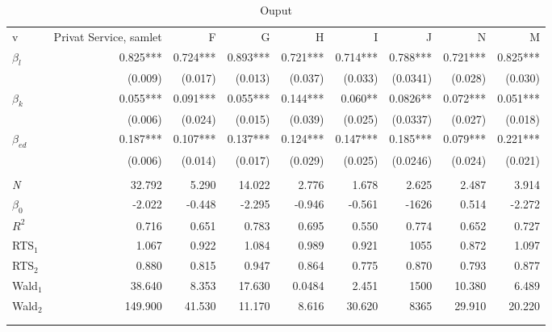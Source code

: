 \begin{table}[tb]
	\centering
	\caption{Ouput}
	\label{tab:ouput3}
	\begin{tabular}{@{}lrrrrrrrr@{}}
		\arrayrulecolor{MidnightBlue}\toprule
		v            & Privat Service, samlet & F        & G        & H        & I        & J        & N        & M        \\ \arrayrulecolor{MidnightBlue}\midrule
		$\beta_l$    & 0.825***               & 0.724*** & 0.893*** & 0.721*** & 0.714*** & 0.788*** & 0.721*** & 0.825*** \\
		& (0.009)                & (0.017)  & (0.013)  & (0.037)  & (0.033)  & (0.0341) & (0.028)  & (0.030)  \\
		$\beta_k$    & 0.055***               & 0.091*** & 0.055*** & 0.144*** & 0.060**  & 0.0826** & 0.072*** & 0.051*** \\
		& (0.006)                & (0.024)  & (0.015)  & (0.039)  & (0.025)  & (0.0337) & (0.027)  & (0.018)  \\
		$\beta_{ed}$ & 0.187***               & 0.107*** & 0.137*** & 0.124*** & 0.147*** & 0.185*** & 0.079*** & 0.221*** \\
		& (0.006)                & (0.014)  & (0.017)  & (0.029)  & (0.025)  & (0.0246) & (0.024)  & (0.021)  \\
		&                        &          &          &          &          &          &          &          \\
		\emph{N}   & 32.792                 & 5.290    & 14.022   & 2.776    & 1.678    & 2.625    & 2.487    & 3.914    \\
		$\beta_0$    & -2.022                 & -0.448   & -2.295   & -0.946   & -0.561   & -1626    & 0.514    & -2.272   \\
		$R^2$        & 0.716                  & 0.651    & 0.783    & 0.695    & 0.550    & 0.774    & 0.652    & 0.727    \\
		RTS$_1$      & 1.067                  & 0.922    & 1.084    & 0.989    & 0.921    & 1055     & 0.872    & 1.097    \\
		RTS$_2$      & 0.880                  & 0.815    & 0.947    & 0.864    & 0.775    & 0.870    & 0.793    & 0.877    \\
		Wald$_1$     & 38.640                 & 8.353    & 17.630   & 0.0484   & 2.451    & 1500     & 10.380   & 6.489    \\
		Wald$_2$     & 149.900                & 41.530   & 11.170   & 8.616    & 30.620   & 8365     & 29.910   & 20.220  \\
		\arrayrulecolor{MidnightBlue}\midrule
		\multicolumn{9}{l}{Standardfejl i parantes. Kilde: Danmarks Statistik og egne beregninger.} \\
		\arrayrulecolor{MidnightBlue}\bottomrule
	\end{tabular}
\end{table}